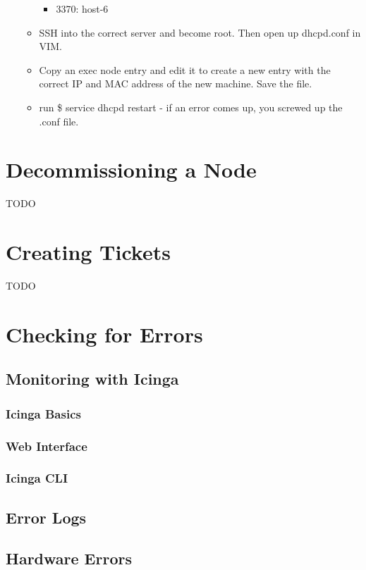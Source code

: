 \documentclass[10pt,letterpaper]{article}
\begin{document}
\begin{enumerate}
\begin{itemize}
\begin{itemize}
                \item 3370: host-6
            \end{itemize}
            \item SSH into the correct server and become root. Then open up dhcpd.conf in VIM.
            \item Copy an exec node entry and edit it to create a new entry with the
            correct IP and MAC address of the new machine. Save the file.
            \item run {\selectfont \$ service dhcpd restart } - if
            an error comes up, you screwed up the .conf file.
        \end{itemize}
    \end{enumerate}
\clearpage

\section{Decommissioning a Node}
    TODO
\clearpage

\section{Creating Tickets}
    TODO
\clearpage

\section{Checking for Errors}
    \subsection{Monitoring with Icinga}
        \subsubsection{Icinga Basics}
        \subsubsection{Web Interface}
        \subsubsection{Icinga CLI}
    \subsection{Error Logs}
    \subsection{Hardware Errors}
\clearpage
\end{document}
